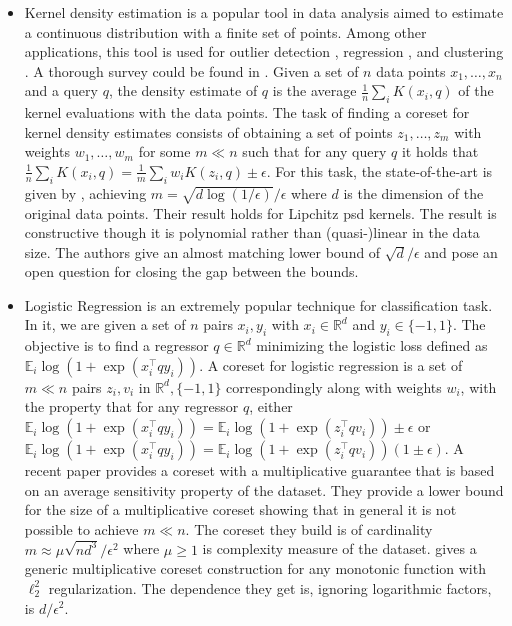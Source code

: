 \documentclass[anon,12pt]{colt2019} %
\newcommand{\R}{\mathbb{R}}
\newcommand{\E}{\mathbb{E}}
\newcommand{\eps}{\epsilon}
\begin{document}
\begin{itemize}
\item Kernel density estimation is a popular tool in data analysis aimed to estimate a continuous distribution with a finite set of points. Among other applications, this tool is used for outlier detection \cite{schubert2014generalized}, regression \cite{fan2018local}, and clustering \cite{rinaldo2010generalized}. A thorough survey could be found in \cite{silverman2018density}. Given a set of $n$ data points $x_1,\ldots,x_n$ and a query $q$, the density estimate of $q$ is the average $\frac{1}{n} \sum_i K(x_i,q)$ of the kernel evaluations with the data points. The task of finding a coreset for kernel density estimates consists of obtaining a set of points $z_1,\ldots,z_m$ with weights $w_1,\ldots,w_m$ for some $m \ll n$ such that for any query $q$ it holds that 
$\frac{1}{n} \sum_i K(x_i,q) = \frac{1}{m} \sum_i w_i K(z_i,q) \pm \eps$. For this task, the state-of-the-art is given by \cite{DBLP:journals/corr/abs-1802-01751}, achieving $m=\sqrt{d\log(1/\eps)}/\eps$ where $d$ is the dimension of the original data points. Their result holds for Lipchitz psd kernels. The result is constructive though it is polynomial rather than (quasi-)linear in the data size. The authors give an almost matching lower bound of $\sqrt{d}/\eps$ and pose an open question for closing the gap between the bounds.

\item Logistic Regression is an extremely popular technique for classification task. In it, we are given a set of $n$ pairs $x_i,y_i$ with $x_i \in \R^d$ and $y_i \in \{-1,1\}$. The objective is to find a regressor $q \in \R^d$ minimizing the logistic loss defined as $\E_i \log(1+\exp(x_i^\top q y_i))$. A coreset for logistic regression is a set of $m \ll n$ pairs $z_i, v_i$ in $\R^d, \{-1,1\}$ correspondingly along with weights $w_i$, with the property that for any regressor $q$, either $\E_i \log(1+\exp(x_i^\top q y_i)) = \E_i \log(1+\exp(z_i^\top q v_i)) \pm \eps$ or $\E_i \log(1+\exp(x_i^\top q y_i)) = \E_i \log(1+\exp(z_i^\top q v_i)) (1 \pm \eps)$. A recent paper \cite{DBLP:journals/corr/abs-1805-08571} provides a coreset with a multiplicative guarantee that is based on an average sensitivity property of the dataset. They provide a lower bound for the size of a multiplicative coreset showing that in general it is not possible to achieve $m \ll n$. The coreset they build is of cardinality $m \approx \mu\sqrt{nd^3}/\eps^2$ where $\mu \geq 1$ is complexity measure of the dataset.  \cite{tolochinsky2018coresets} gives a generic multiplicative coreset construction for any monotonic function with $\ell_2^2$ regularization. The dependence they get is, ignoring logarithmic factors, is $d/\eps^2$.  


\end{itemize}
\end{document}
